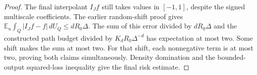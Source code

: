 \begin{proof}
The final interpolant $I_Jf$ still takes values in $[-1,1]$, despite the signed multiscale coefficients. The earlier random-shift proof gives
$\mathbb E_u\int_Q|I_Jf-f|\,dU_Q\le dR_0\Delta$.
The sum of this error divided by $dR_0\Delta$ and the constructed path budget divided by $K_dR_0\Delta^{-d}$ has expectation at most two. Some shift makes the sum at most two. For that shift, each nonnegative term is at most two, proving both claims simultaneously. Density domination and the bounded-output squared-loss inequality give the final risk estimate.
\end{proof}


